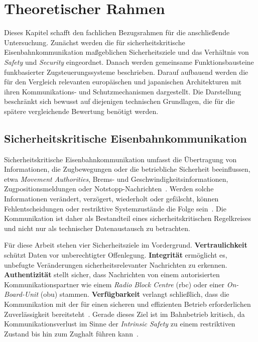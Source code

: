 \documentclass[runningheads]{res/llncs}
\begin{document}
\section{Theoretischer Rahmen}
\label{sec:Theoretischer_Rahmen}

Dieses Kapitel schafft den fachlichen Bezugsrahmen für die anschließende Untersuchung. Zunächst werden die für sicherheitskritische Eisenbahnkommunikation maßgeblichen Sicherheitsziele und das Verhältnis von \textit{Safety} und \textit{Security} eingeordnet. Danach werden gemeinsame Funktionsbausteine funkbasierter Zugsteuerungssysteme beschrieben. Darauf aufbauend werden die für den Vergleich relevanten europäischen und japanischen Architekturen mit ihren Kommunikations- und Schutzmechanismen dargestellt. Die Darstellung beschränkt sich bewusst auf diejenigen technischen Grundlagen, die für die spätere vergleichende Bewertung benötigt werden.

\subsection{Sicherheitskritische Eisenbahnkommunikation}
\label{sec:Sicherheitskritische_Eisenbahnkommunikation}

Sicherheitskritische Eisenbahnkommunikation umfasst die Übertragung von Informationen, die Zugbewegungen oder die betriebliche Sicherheit beeinflussen, etwa \textit{Movement Authorities}, Brems- und Geschwindigkeitsinformationen, Zugpositionsmeldungen oder Notstopp-Nachrichten~\parencite[S. 120--121]{trinckaufETCS2024}. Werden solche Informationen verändert, verzögert, wiederholt oder gefälscht, können Fehlentscheidungen oder restriktive Systemzustände die Folge sein~\parencite[S. 17]{iwamotoTrain2024}. Die Kommunikation ist daher als Bestandteil eines sicherheitskritischen Regelkreises und nicht nur als technischer Datenaustausch zu betrachten.

Für diese Arbeit stehen vier Sicherheitsziele im Vordergrund. \textbf{Vertraulichkeit} schützt Daten vor unberechtigter Offenlegung. \textbf{Integrität} ermöglicht es, unbefugte Veränderungen sicherheitsrelevanter Nachrichten zu erkennen. \textbf{Authentizität} stellt sicher, dass Nachrichten von einem autorisierten Kommunikationspartner wie einem \textit{Radio Block Centre} (\gls{rbc}) oder einer \textit{On-Board-Unit} (\gls{obu}) stammen. \textbf{Verfügbarkeit} verlangt schließlich, dass die Kommunikation mit der für einen sicheren und effizienten Betrieb erforderlichen Zuverlässigkeit bereitsteht~\parencite[S. 207]{trinckaufETCS2024}. Gerade dieses Ziel ist im Bahnbetrieb kritisch, da Kommunikationsverlust im Sinne der \textit{Intrinsic Safety} zu einem restriktiven Zustand bis hin zum Zughalt führen kann~\parencite[S. 56]{gaggeroSurvey2024}.
\end{document}
